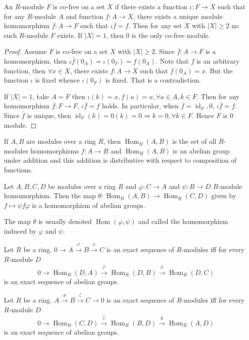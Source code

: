 \documentclass{article}
\DeclareMathOperator{\Hom}{Hom}
\begin{document}
\begin{theorem}
    An $R$-module $F$ is co-free on a set $X$ if there exists a function $\iota:F\to X$ such that for any $R$-module $A$ and function $f:A\to X$, there exists a unique module homomorphism $\bar{f}:A\to F$ such that $\iota \bar{f}=f$. Then for any set $X$ with $\left\lvert X \right\rvert \geqslant 2$ no such $R$-module $F$ exists. If $\left\lvert X \right\rvert =1$, then $0$ is the only co-free module.
\end{theorem}
\begin{proof}
    Assume $F$ is co-free on a set $X$ with $\left\lvert X \right\rvert \geqslant 2$. Since $\bar{f}:A\to F$ is a homomorphism, then $\iota\bar{f}(0_A)=\iota(0_F)=f(0_A)$. Note that $f$ is an arbitrary function, then $\forall x \in X$, there exists $f:A\to X$ such that $f(0_A)=x$. But the function $\iota$ is fixed whence $\iota(0_F)$ is fixed. That is a contradiction. 
    
    If $\left\lvert X \right\rvert =1$, take $A=F$ then $\iota(k)=x, f(a)=x, \forall a \in A, k \in F$. Then for any homomorphism $\bar{f}:F\to F$, $\iota\bar{f}=f$ holds. In particular, when $\bar{f}=\operatorname{id}_{F}, 0$, $\iota\bar{f}=f$. Since $\bar{f}$ is unique, then $\operatorname{id}_{F}(k)=0(k)=0\Rightarrow k=0, \forall k \in F$. Hence $F$ is $0$ module.
\end{proof}

If $A,B$ are modules over a ring $R$, then $\Hom_{R}(A, B)$ is the set of all $R$-modules homomorphisms $f:A\to B$ and $\Hom_{R}(A, B)$ is an abelian group under addition and this addition is distributive with respect to composition of functions.

\begin{theorem}
    Let $A,B,C,D$ be modules over a ring $R$ and $\varphi:C\to A$ and $\psi:B\to D$ $R$-module homomorphism. Then the map $\theta:\Hom_{R}(A, B)\to \Hom_{R}(C, D)$ given by $f\mapsto \psi f \varphi$ is a homomorphism of abelian groups.
\end{theorem}
The map $\theta$ is usually denoted $\Hom_{}(\varphi, \psi)$ and called the homomorphism induced by $\varphi$ and $\psi$.

\begin{theorem}
    Let $R$ be a ring. $0\to A\xrightarrow{\varphi}B\xrightarrow{\psi}C$ is an exact sequence of $R$-modules iff for every $R$-module $D$
    $$0\to \Hom_{R}(D, A)\xrightarrow{\bar{\varphi}}\Hom_{R}(D, B)\xrightarrow{\bar{\psi}}\Hom_{R}(D, C)$$
    is an exact sequence of abelian groups.
\end{theorem}
\begin{theorem}
    Let $R$ be a ring. $A\xrightarrow{\theta}B\xrightarrow{\zeta}C\to 0$ is an exact sequence of $R$-modules iff for every $R$-module $D$
    $$0\to \Hom_{R}(C, D)\xrightarrow{\bar{\zeta}}\Hom_{R}(B, D)\xrightarrow{\bar{\theta}}\Hom_{R}(A, D)$$
    is an exact sequence of abelian groups.
\end{theorem}
\end{document}
